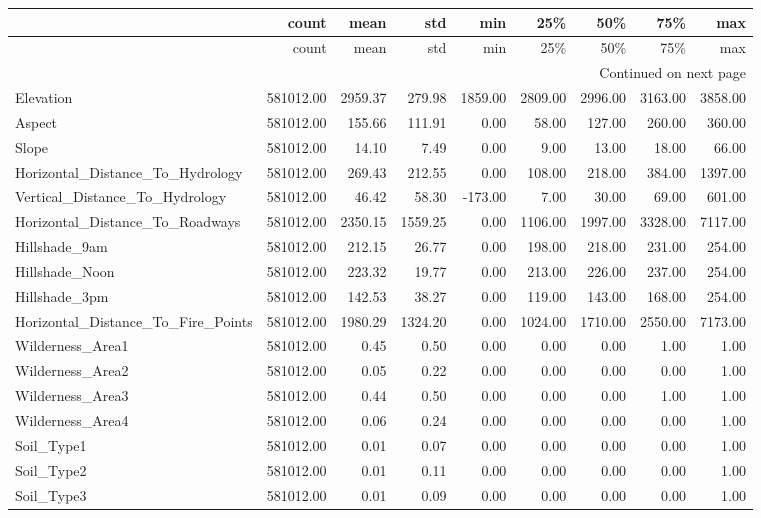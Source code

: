 \begin{longtable}{lrrrrrrrr}
\toprule
 & count & mean & std & min & 25\% & 50\% & 75\% & max \\
\midrule
\endfirsthead
\toprule
 & count & mean & std & min & 25\% & 50\% & 75\% & max \\
\midrule
\endhead
\midrule
\multicolumn{9}{r}{Continued on next page} \\
\midrule
\endfoot
\bottomrule
\endlastfoot
Elevation & 581012.00 & 2959.37 & 279.98 & 1859.00 & 2809.00 & 2996.00 & 3163.00 & 3858.00 \\
Aspect & 581012.00 & 155.66 & 111.91 & 0.00 & 58.00 & 127.00 & 260.00 & 360.00 \\
Slope & 581012.00 & 14.10 & 7.49 & 0.00 & 9.00 & 13.00 & 18.00 & 66.00 \\
Horizontal\_Distance\_To\_Hydrology & 581012.00 & 269.43 & 212.55 & 0.00 & 108.00 & 218.00 & 384.00 & 1397.00 \\
Vertical\_Distance\_To\_Hydrology & 581012.00 & 46.42 & 58.30 & -173.00 & 7.00 & 30.00 & 69.00 & 601.00 \\
Horizontal\_Distance\_To\_Roadways & 581012.00 & 2350.15 & 1559.25 & 0.00 & 1106.00 & 1997.00 & 3328.00 & 7117.00 \\
Hillshade\_9am & 581012.00 & 212.15 & 26.77 & 0.00 & 198.00 & 218.00 & 231.00 & 254.00 \\
Hillshade\_Noon & 581012.00 & 223.32 & 19.77 & 0.00 & 213.00 & 226.00 & 237.00 & 254.00 \\
Hillshade\_3pm & 581012.00 & 142.53 & 38.27 & 0.00 & 119.00 & 143.00 & 168.00 & 254.00 \\
Horizontal\_Distance\_To\_Fire\_Points & 581012.00 & 1980.29 & 1324.20 & 0.00 & 1024.00 & 1710.00 & 2550.00 & 7173.00 \\
Wilderness\_Area1 & 581012.00 & 0.45 & 0.50 & 0.00 & 0.00 & 0.00 & 1.00 & 1.00 \\
Wilderness\_Area2 & 581012.00 & 0.05 & 0.22 & 0.00 & 0.00 & 0.00 & 0.00 & 1.00 \\
Wilderness\_Area3 & 581012.00 & 0.44 & 0.50 & 0.00 & 0.00 & 0.00 & 1.00 & 1.00 \\
Wilderness\_Area4 & 581012.00 & 0.06 & 0.24 & 0.00 & 0.00 & 0.00 & 0.00 & 1.00 \\
Soil\_Type1 & 581012.00 & 0.01 & 0.07 & 0.00 & 0.00 & 0.00 & 0.00 & 1.00 \\
Soil\_Type2 & 581012.00 & 0.01 & 0.11 & 0.00 & 0.00 & 0.00 & 0.00 & 1.00 \\
Soil\_Type3 & 581012.00 & 0.01 & 0.09 & 0.00 & 0.00 & 0.00 & 0.00 & 1.00 \\

\end{longtable}

